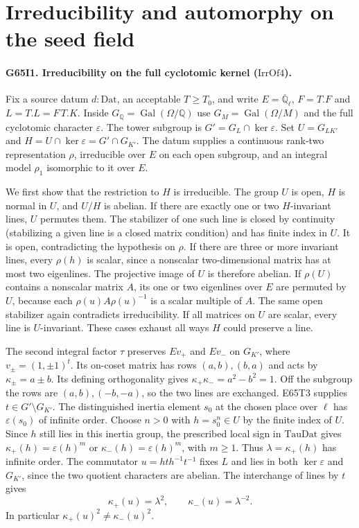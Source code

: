 \section{Irreducibility and automorphy on the seed field}

\paragraph{G65I1. Irreducibility on the full cyclotomic kernel ($\mathrm{IrrOf4}$).}
Fix a source datum $d:\mathrm{Dat}$, an acceptable $T\ge T_0$, and
write $E=\overline{\mathbb Q}_\ell$, $F=T.F$ and $L=T.L=F\,T.K$.
Inside $G_{\mathbb Q}=\operatorname{Gal}(\Omega/\mathbb Q)$ use
$G_M=\operatorname{Gal}(\Omega/M)$ and the full cyclotomic character
$\varepsilon$. The tower subgroup is $G'=G_L\cap\ker\varepsilon$.
Set $U=G_{L K'}$ and $H=U\cap\ker\varepsilon=G'\cap G_{K'}$.
The datum supplies a continuous rank-two representation $\rho$,
irreducible over $E$ on each open subgroup, and an integral model
$\rho_1$ isomorphic to it over $E$.

We first show that the restriction to $H$ is irreducible. The group
$U$ is open, $H$ is normal in $U$, and $U/H$ is abelian. If there
are exactly one or two $H$-invariant lines, $U$ permutes them.
The stabilizer of one such line is closed by continuity (stabilizing
a given line is a closed matrix condition) and has finite index in
$U$. It is open, contradicting the hypothesis on $\rho$. If there
are three or more invariant lines, every $\rho(h)$ is scalar,
since a nonscalar two-dimensional matrix has at most two eigenlines.
The projective image of $U$ is therefore abelian. If $\rho(U)$
contains a nonscalar matrix $A$, its one or two eigenlines over $E$
are permuted by $U$, because each $\rho(u)A\rho(u)^{-1}$ is a
scalar multiple of $A$. The same open stabilizer again contradicts
irreducibility. If all matrices on $U$ are scalar, every line is
$U$-invariant. These cases exhaust all ways $H$ could preserve a line.

The second integral factor $\tau$ preserves $E v_+$ and $E v_-$ on
$G_{K'}$, where $v_\pm=(1,\pm1)^t$. Its on-coset matrix has rows
$(a,b),(b,a)$ and acts by $\kappa_\pm=a\pm b$. Its defining
orthogonality gives $\kappa_+\kappa_-=a^2-b^2=1$.
Off the subgroup the rows are $(a,b),(-b,-a)$, so the two lines
are exchanged. E65T3 supplies $t\in G'\setminus G_{K'}$.
The distinguished inertia element $s_0$ at the chosen place over
$\ell$ has $\varepsilon(s_0)$ of infinite order. Choose $n>0$ with
$h=s_0^n\in U$ by the finite index of $U$. Since $h$ still lies in
this inertia group, the prescribed local sign in $\mathrm{TauDat}$
gives $\kappa_+(h)=\varepsilon(h)^m$ or
$\kappa_-(h)=\varepsilon(h)^m$, with $m\ge1$. Thus
$\lambda=\kappa_+(h)$ has infinite order. The commutator
$u=hth^{-1}t^{-1}$ fixes $L$ and lies in both $\ker\varepsilon$
and $G_{K'}$, since the two quotient characters are abelian.
The interchange of lines by $t$ gives
\[
             \kappa_+(u)=\lambda^2,\qquad
             \kappa_-(u)=\lambda^{-2}.
\]
In particular $\kappa_+(u)^2\ne\kappa_-(u)^2$.

